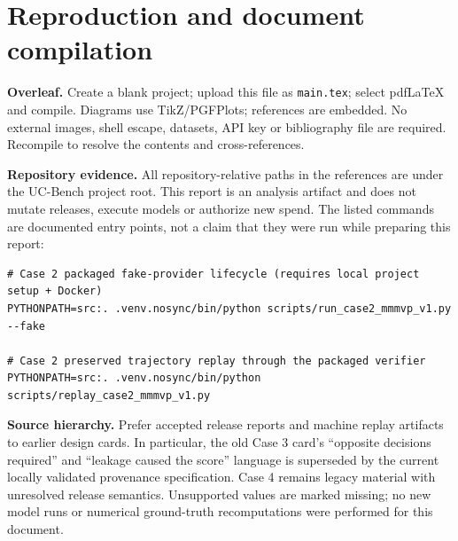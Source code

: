 \documentclass[11pt,a4paper]{article}
\begin{document}
\section{Reproduction and document compilation}

\textbf{Overleaf.} Create a blank project; upload this file as \texttt{main.tex}; select pdfLaTeX and compile. Diagrams use TikZ/PGFPlots; references are embedded. No external images, shell escape, datasets, API key or bibliography file are required. Recompile to resolve the contents and cross-references.

\textbf{Repository evidence.} All repository-relative paths in the references are under the UC-Bench project root. This report is an analysis artifact and does not mutate releases, execute models or authorize new spend. The listed commands are documented entry points, not a claim that they were run while preparing this report:
\begin{lstlisting}
# Case 2 packaged fake-provider lifecycle (requires local project setup + Docker)
PYTHONPATH=src:. .venv.nosync/bin/python scripts/run_case2_mmmvp_v1.py --fake

# Case 2 preserved trajectory replay through the packaged verifier
PYTHONPATH=src:. .venv.nosync/bin/python scripts/replay_case2_mmmvp_v1.py
\end{lstlisting}

\textbf{Source hierarchy.} Prefer accepted release reports and machine replay artifacts to earlier design cards. In particular, the old Case 3 card's ``opposite decisions required'' and ``leakage caused the score'' language is superseded by the current locally validated provenance specification. Case 4 remains legacy material with unresolved release semantics. Unsupported values are marked missing; no new model runs or numerical ground-truth recomputations were performed for this document.
\end{document}
